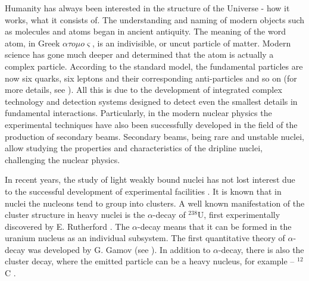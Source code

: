 \documentclass[
12pt, %
oneside, %
english, %
onehalfspacing, %
onehalfspacing, %
headsepline, %
]{MastersDoctoralThesis} %
\begin{document}
Humanity has always been interested in the structure of the Universe - how it works, what it consists of. 
The understanding and naming of modern objects such as molecules and atoms began in ancient antiquity.
 The meaning of the word atom, in Greek $\alpha \tau o \mu o \varsigma$, is an indivisible, or uncut particle of matter. 
 Modern science has gone much deeper and determined that the atom is actually a complex particle. 
 According to the standard model, the fundamental particles are now six quarks, six leptons and their corresponding anti-particles and so on (for more details, see \cite{donoghue2014dynamics, griffiths2020introduction, ramond1999journeys}).  
All this is due to the development of integrated complex technology and detection systems designed to detect even the smallest details in fundamental interactions.
Particularly, in the modern nuclear physics the experimental techniques have also been successfully developed in the field of the production of secondary beams. 
Secondary beams, being rare and unstable nuclei, allow studying the properties and characteristics of the dripline nuclei, challenging the nuclear physics.

In recent years, the study of light weakly bound nuclei  has not lost interest due to the successful development of experimental facilities \cite{ter2004radioactive, yano2007riken, gade2016nscl, hong2014plan, fukuda2013identification}. 
It is known that in nuclei the nucleons tend to group into clusters. 
A well known manifestation of the cluster structure in heavy nuclei is the $\alpha$-decay of $^{238}$U, first experimentally discovered by E. Rutherford \cite{rutherford1899viii}. 
The $\alpha$-decay means that it can be formed in the uranium nucleus as an individual  subsystem.
The first quantitative theory of  $\alpha$-decay was developed by G. Gamov (see \cite{stuewer1986gamow}). In addition to $\alpha$-decay, there is also the cluster decay, where the emitted particle can be a heavy nucleus, for example -- $ ^ {12}$C \cite{poenaru2012cluster}.
\end{document}

